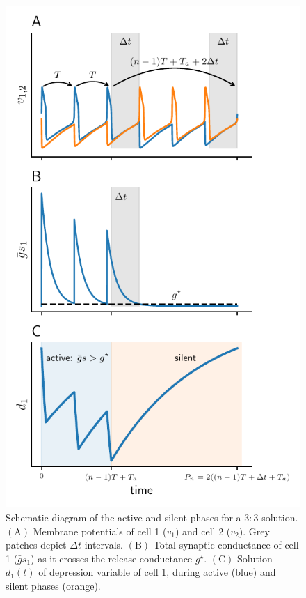 \documentclass[utf8]{frontiersFPHY} %
\newcommand{\gbar}{\bar g}
\newcommand{\delt}{\Delta t}
\begin{document}
\begin{figure}[h!]
  \centering
  \includegraphics{free-quiet}
  \caption{Schematic diagram of the active and silent phases for a $3:3$ solution.
    $\bm{\mathrm{(A)}}$ Membrane potentials of cell 1 ($v_{1}$) and cell 2 ($v_{2}$).
    Grey patches depict $\delt$ intervals.
    $\bm{\mathrm{(B)}}$ Total synaptic conductance of cell 1 ($\gbar s_1$) as it crosses the release conductance $g^{\star}$.
    $\bm{\mathrm{(C)}}$ Solution $d_1(t)$ of depression variable of cell 1, during active (blue) and silent phases (orange).~\label{fig:free-quiet}}
\end{figure}
\end{document}
